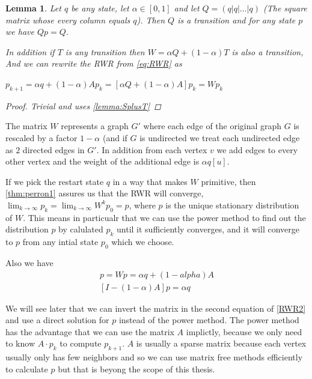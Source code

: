 \documentclass[a4paper,10pt]{article}
\theoremstyle{definition}
\theoremstyle{remark}
\theoremstyle{plain}
\newtheorem{lemma}{Lemma}[section]
\begin{document}
\begin{lemma}
\label{lemma:Qq}
Let $q$ be any state, let $\alpha \in [0,1]$ and let  
$ Q = (q|q|\dots|q)$ (The square matrix whose every column equals $q$).
Then $Q$ is a transition and for any state $p$ we have $Qp = Q$.

In addition if $T$ is any transition then $W = \alpha Q + (1-\alpha)
T$ is also a transition, And we can rewrite the RWR from
\ref{eq:RWR} as

$p_{k+1} = \alpha q + (1 - \alpha) Ap_k = 
[\alpha Q + (1 - \alpha) A] p_k = W p_k$

\begin{proof}
Trivial and uses \ref{lemma:SplusT}
\end{proof}
\end{lemma}

The matrix $W$ represents a graph $G'$ where each edge of the
original graph $G$ is rescaled by a factor $1 - \alpha$ (and if $G$ is
undirected we treat each undirected edge as $2$ directed edges in
$G'$. In addition from each vertex $v$ we add edges to every other
vertex and the weight of the additional edge is $\alpha q[u]$.

If we pick the restart state $q$ in a way that makes $W$ primitive,
then \ref{thm:perron1} assures us that the RWR will converge,
$\lim_{k \to \infty} p_k =\lim_{k \to \infty} W^k p_0 = p$, where
$p$ is the unique stationary distribution of $W$. This means in
particualr that we can use the power method to find out the
distribution $p$ by calulated $p_k$ until it sufficiently converges,
and it will converge to $p$ from any intial state $p_0$ which we
choose. 

Also we have
\begin{equation}
\label{eq:RWR2}
\begin{aligned}
p = Wp = \alpha q + (1 - alpha) A \\
[I - (1 - \alpha)A] p = \alpha q
\end{aligned}
\end{equation}

We will see later that we can invert the matrix in the second
equation of \ref{RWR2} and use a direct solution for $p$ instead of
the power method. The power method has the advantage that we can use
the matrix $A$ implictly, because we only need to know $A \cdot p_k$
to compute $p_{k+1}$. $A$ is usually a sparse matrix because each
vertex usually only has few neighbors and so we can use matrix free
methods efficiently to calculate $p$ but that is beyong the scope of
this thesis.
\end{document}
